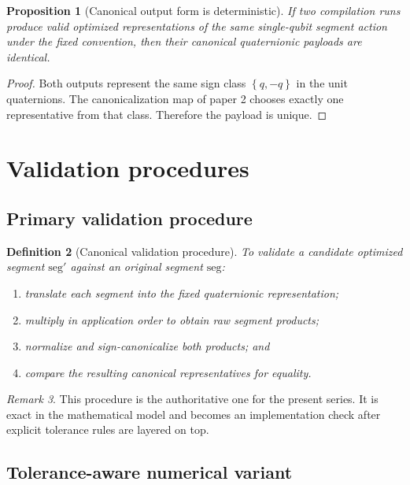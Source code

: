 \documentclass[11pt]{article}
\newtheorem{definition}{Definition}[section]
\newtheorem{proposition}[definition]{Proposition}
\theoremstyle{remark}
\newtheorem{remark}[definition]{Remark}
\newcommand{\set}[1]{\left\{ #1 \right\}}
\begin{document}
\begin{proposition}[Canonical output form is deterministic]
If two compilation runs produce valid optimized representations of the same
single-qubit segment action under the fixed convention, then their canonical
quaternionic payloads are identical.
\end{proposition}

\begin{proof}
Both outputs represent the same sign class $\set{q,-q}$ in the unit quaternions.
The canonicalization map of paper 2 chooses exactly one representative from that
class. Therefore the payload is unique.
\end{proof}

\section{Validation procedures}

\subsection{Primary validation procedure}

\begin{definition}[Canonical validation procedure]
To validate a candidate optimized segment $\mathrm{seg}'$ against an original
segment $\mathrm{seg}$:
\begin{enumerate}[label=(\arabic*), leftmargin=1.5em]
\item translate each segment into the fixed quaternionic representation;
\item multiply in application order to obtain raw segment products;
\item normalize and sign-canonicalize both products; and
\item compare the resulting canonical representatives for equality.
\end{enumerate}
\end{definition}

\begin{remark}
This procedure is the authoritative one for the present series. It is exact in
the mathematical model and becomes an implementation check after explicit
tolerance rules are layered on top.
\end{remark}

\subsection{Tolerance-aware numerical variant}
\end{document}
